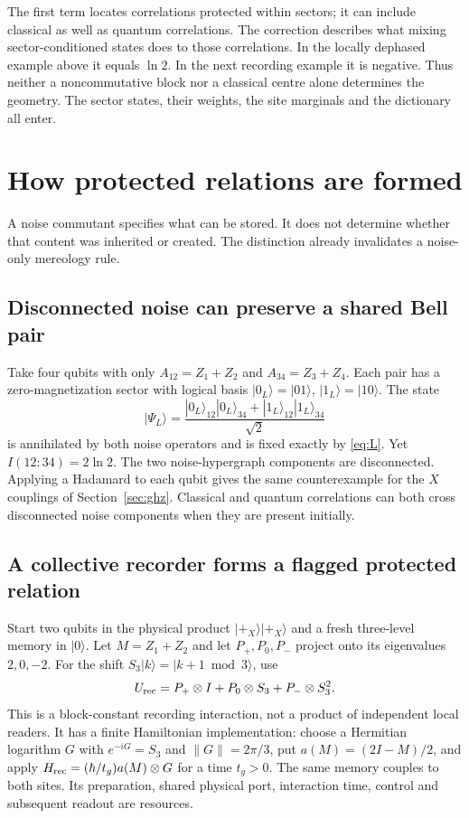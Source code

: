 \documentclass[12pt,a4paper]{article}
\newcommand{\ket}[1]{|#1\rangle}
\begin{document}
The first term locates correlations protected within sectors; it can
include classical as well as quantum correlations. The correction
describes what mixing sector-conditioned states does to those
correlations. In the locally dephased example above it equals $\ln2$.
In the next recording example it is negative. Thus neither a
noncommutative block nor a classical centre alone determines the
geometry. The sector states, their weights, the site marginals and
the dictionary all enter.

\section{How protected relations are formed}
\label{sec:formation}

A noise commutant specifies what can be stored. It does not determine
whether that content was inherited or created. The distinction already
invalidates a noise-only mereology rule.

\subsection{Disconnected noise can preserve a shared Bell pair}

Take four qubits with only $A_{12}=Z_1+Z_2$ and
$A_{34}=Z_3+Z_4$. Each pair has a zero-magnetization sector with logical
basis $\ket{0_L}=\ket{01}$, $\ket{1_L}=\ket{10}$. The state
\begin{equation}\label{eq:disconnected-bell}
 \ket{\Psi_L}
 =\frac{\ket{0_L}_{12}\ket{0_L}_{34}
             +\ket{1_L}_{12}\ket{1_L}_{34}}{\sqrt2}
\end{equation}
is annihilated by both noise operators and is fixed exactly by
\eqref{eq:L}. Yet $I(12:34)=2\ln2$. The two noise-hypergraph components
are disconnected. Applying a Hadamard to each qubit gives the same
counterexample for the $X$ couplings of Section~\ref{sec:ghz}.
Classical and quantum correlations can both cross disconnected noise
components when they are present initially.

\subsection{A collective recorder forms a flagged protected relation}

Start two qubits in the physical product $\ket{+_X}\ket{+_X}$ and a
fresh three-level memory in $\ket0$. Let $M=Z_1+Z_2$ and let
$P_+,P_0,P_-$ project onto its eigenvalues $2,0,-2$.
For the shift $S_3\ket{k}=\ket{k+1\bmod3}$, use
\begin{equation}\label{eq:formation-recorder}
 U_{\rm rec}=P_+\otimes I+P_0\otimes S_3+P_-\otimes S_3^2 .
\end{equation}
This is a block-constant recording interaction, not a product of
independent local readers. It has a finite Hamiltonian implementation:
choose a Hermitian logarithm $G$ with $e^{-iG}=S_3$ and
$\|G\|=2\pi/3$, put $a(M)=(2I-M)/2$, and apply
$H_{\rm rec}=(\hbar/t_g)a(M)\otimes G$ for a time $t_g>0$.
The same memory couples to both sites. Its preparation, shared physical
port, interaction time, control and subsequent readout are resources.
\end{document}
